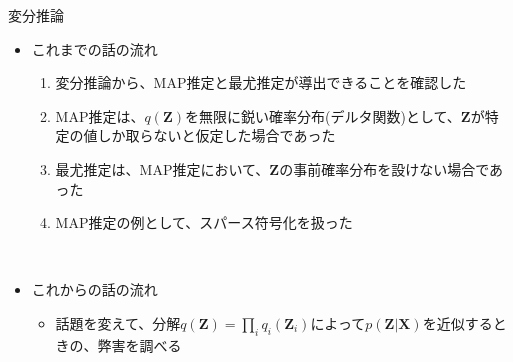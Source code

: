 \documentclass[dvipdfmx,notheorems,t]{beamer}
\begin{document}
\begin{frame}{変分推論}

\begin{itemize}
	\item これまでの話の流れ
	\begin{enumerate}
		\item 変分推論から、MAP推定と最尤推定が導出できることを確認した
		\newline
		\item MAP推定は、$q(\bm{Z})$を無限に鋭い確率分布(デルタ関数)として、$\bm{Z}$が特定の値しか取らないと仮定した場合であった
		\item 最尤推定は、MAP推定において、$\bm{Z}$の事前確率分布を設けない場合であった
		\newline
		\item MAP推定の例として、スパース符号化を扱った
	\end{enumerate} \
	
	\item これからの話の流れ
	\begin{itemize}
		\item 話題を変えて、分解$q(\bm{Z}) = \prod_i q_i(\bm{Z}_i)$によって$p(\bm{Z} | \bm{X})$を近似するときの、弊害を調べる
	\end{itemize}
\end{itemize}

\end{frame}
\end{document}
